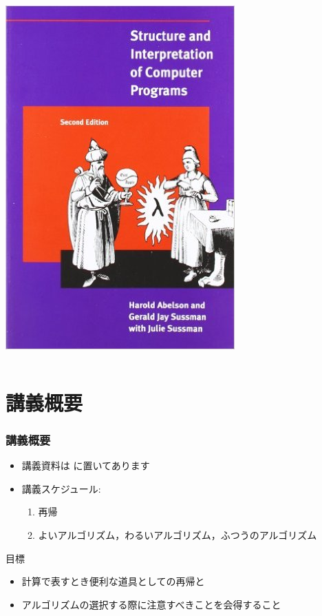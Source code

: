 \begin{frame}[shrink]
\begin{columns}[c]
\begin{column}{0.45\textwidth}
\includegraphics[scale=.25]{./Figure/SICP.jpg}
    \end{column}
  \end{columns}
\end{frame}
%
%
\section{講義概要}
\begin{frame}
\frametitle{講義概要}
  \begin{itemize}
\item 講義資料は \href{https://sites.google.com/presystems.xyz/elementaryCS/}{} に置いてあります
\item 講義スケジュール:
    \begin{enumerate}
\item 再帰
\item よいアルゴリズム，わるいアルゴリズム，ふつうのアルゴリズム
    \end{enumerate}
  \end{itemize}
  \begin{block}{目標}
    \begin{itemize}
\item 計算で表すとき便利な道具としての再帰と
\item アルゴリズムの選択する際に注意すべきことを会得すること
    \end{itemize}
  \end{block}
\end{frame}
%
%
